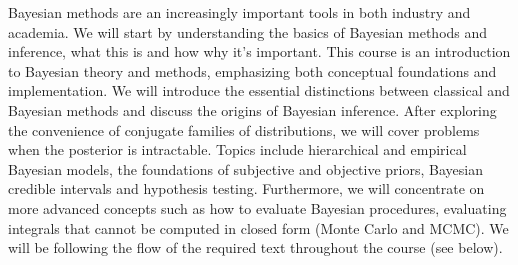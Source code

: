 \documentclass[11pt]{article}
\begin{document}
Bayesian methods are an increasingly important tools
in both industry and academia. We will start by understanding the basics of Bayesian methods and inference, what this is and how why it's important. 
This course is an introduction to Bayesian theory and methods, emphasizing both conceptual foundations and implementation. We will introduce the essential distinctions between classical and Bayesian methods and discuss the origins of Bayesian inference. After exploring the convenience of conjugate families of distributions, we will cover problems when the posterior is intractable. Topics include hierarchical and empirical Bayesian models, the foundations of subjective and objective priors, Bayesian credible intervals and hypothesis testing. Furthermore, we 
will  concentrate on more advanced concepts such as how to evaluate Bayesian procedures, evaluating integrals that cannot be computed in closed form (Monte Carlo and MCMC). We will be following the flow of the required text throughout the course (see below). \\
\end{document}
